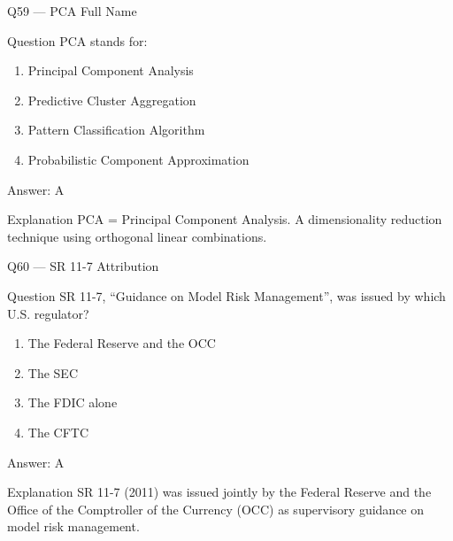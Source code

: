 \documentclass[aspectratio=169,8pt]{beamer}
\begin{document}
	\begin{frame}{Q59 --- PCA Full Name}
		\begin{block}{Question}
			PCA stands for:
			\begin{enumerate}
				\item Principal Component Analysis
				\item Predictive Cluster Aggregation
				\item Pattern Classification Algorithm
				\item Probabilistic Component Approximation
			\end{enumerate}
		\end{block}
		\begin{exampleblock}{Answer: A}\end{exampleblock}
		\begin{block}{Explanation}
			PCA = Principal Component Analysis. A dimensionality reduction technique using orthogonal linear combinations.
		\end{block}
	\end{frame}
	
	\begin{frame}{Q60 --- SR 11-7 Attribution}
		\begin{block}{Question}
			SR 11-7, ``Guidance on Model Risk Management'', was issued by which U.S. regulator?
			\begin{enumerate}
				\item The Federal Reserve and the OCC
				\item The SEC
				\item The FDIC alone
				\item The CFTC
			\end{enumerate}
		\end{block}
		\begin{exampleblock}{Answer: A}\end{exampleblock}
		\begin{block}{Explanation}
			SR 11-7 (2011) was issued jointly by the Federal Reserve and the Office of the Comptroller of the Currency (OCC) as supervisory guidance on model risk management.
		\end{block}
	\end{frame}
	
\end{document}
